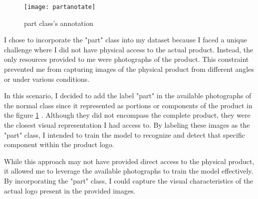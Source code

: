 \begin{figure}[htbp]
    \centering
    
    \begin{minipage}{1\textwidth}
        \centering
        \texttt{[image: partanotate]}
        \caption{part class's annotation}
        \label{fig:image3}
    \end{minipage}
\end{figure}
I chose to incorporate the "part" class into my dataset because I faced a unique challenge where I did not have physical access to the actual product. Instead, the only resources provided to me were photographs of the product. This constraint prevented me from capturing images of the physical product from different angles or under various conditions.

In this scenario, I decided to add the label "part" in the available photographs of the normal class since it represented as  portions or components of the product  in the figure \ref{fig:image3} . Although they did not encompass the complete product, they were the closest visual representation I had access to. By labeling these images as the "part" class, I intended to train the model to recognize and detect that specific component within the product logo.

While this approach may not have provided direct access to the physical product, it allowed me to leverage the available photographs to train the model effectively. By incorporating the "part" class, I could capture the visual characteristics of the actual logo present in the provided images. 
\FloatBarrier

